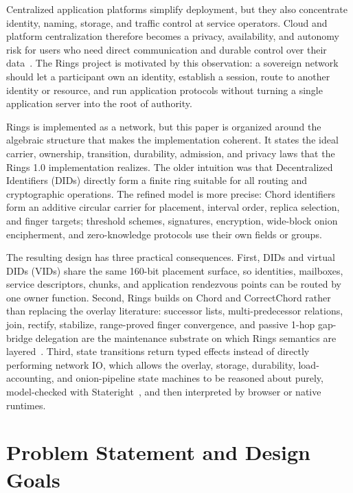 \documentclass[journal]{IEEEtran}
\begin{document}
Centralized application platforms simplify deployment, but they also concentrate
identity, naming, storage, and traffic control at service operators.  Cloud and
platform centralization therefore becomes a privacy, availability, and autonomy
risk for users who need direct communication and durable control over their
data~\cite{Chord,Kademlia,TorNetwork,IPFS}.  The Rings project is motivated by
this observation: a sovereign network should let a participant own an identity,
establish a session, route to another identity or resource, and run application
protocols without turning a single application server into the root of
authority.

Rings is implemented as a network, but this paper is organized around the
algebraic structure that makes the implementation coherent.  It states the
ideal carrier, ownership, transition, durability, admission, and privacy laws
that the Rings 1.0 implementation realizes.  The older intuition was that
Decentralized Identifiers (DIDs) directly form a finite ring suitable for all
routing and cryptographic operations.  The refined model is more precise: Chord
identifiers form an additive circular carrier for placement, interval order,
replica selection, and finger targets; threshold schemes, signatures,
encryption, wide-block onion encipherment, and zero-knowledge protocols use
their own fields or groups.

The resulting design has three practical consequences.  First, DIDs and virtual
DIDs (VIDs) share the same 160-bit placement surface, so identities, mailboxes,
service descriptors, chunks, and application rendezvous points can be
routed by one owner function.  Second, Rings builds on Chord and CorrectChord
rather than replacing the overlay literature: successor lists, multi-predecessor
relations, join, rectify, stabilize, range-proved finger convergence, and
passive 1-hop gap-bridge delegation are the maintenance substrate on which
Rings semantics are layered~\cite{Chord,Stoica2003,ZaveChordCorrect,Freedman2005}.
Third, state transitions return typed effects instead of directly performing
network IO, which allows the overlay, storage, durability, load-accounting, and
onion-pipeline state machines to be reasoned about purely, model-checked with
Stateright~\cite{Stateright}, and then interpreted by browser or native runtimes.

\section{Problem Statement and Design Goals}
\end{document}
